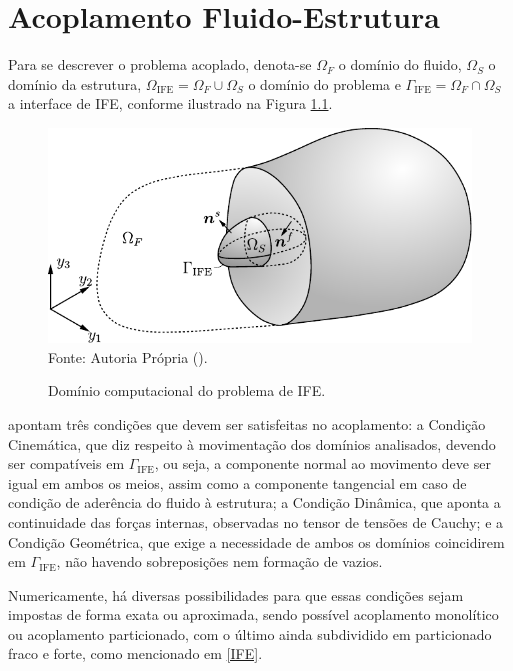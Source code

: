 \chapter{Acoplamento Fluido-Estrutura} \label{AFE}

Para se descrever o problema acoplado, denota-se $\Omega_F$ o domínio do fluido, $\Omega_S$ o domínio da estrutura, $\Omega_\mathrm{IFE}=\Omega_F\cup\Omega_S$ o domínio do problema e $\Gamma_\mathrm{IFE}=\Omega_F\cap\Omega_S$ a interface de IFE, conforme ilustrado na Figura \ref{fig:DomComp}.

\begin{figure}[h!]
    \centering
    \caption{Domínio computacional do problema de IFE.}
    \includegraphics[width=.65\linewidth]{Figuras/Dom_Comp.pdf}
    \\Fonte: Autoria Própria (\the\year).
    \label{fig:DomComp}
\end{figure}

 apontam três condições que devem ser satisfeitas no acoplamento: a Condição Cinemática, que diz respeito à movimentação dos domínios analisados, devendo ser compatíveis em $\Gamma_\mathrm{IFE}$, ou seja, a componente normal ao movimento deve ser igual em ambos os meios, assim como a componente tangencial em caso de condição de aderência do fluido à estrutura; a Condição Dinâmica, que aponta a continuidade das forças internas, observadas no tensor de tensões de Cauchy; e a Condição Geométrica, que exige a necessidade de ambos os domínios coincidirem em $\Gamma_\mathrm{IFE}$, não havendo sobreposições nem formação de vazios.

Numericamente, há diversas possibilidades para que essas condições sejam impostas de forma exata ou aproximada, sendo possível acoplamento monolítico ou acoplamento particionado, com o último ainda subdividido em particionado fraco e forte, como mencionado em \ref{IFE}.


